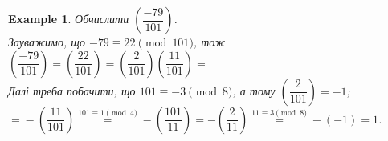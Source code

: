 \documentclass[a4paper, 10pt]{article}
\theoremstyle{theoremdd}
\theoremstyle{theoremdd}
\theoremstyle{theoremdd}
\theoremstyle{theoremdd}
\newtheorem{example}[theorem]{Example}
\theoremstyle{theoremdd}
\theoremstyle{theoremdd}
\theoremstyle{theoremdd}
\theoremstyle{theoremdd}
\begin{document}
\begin{example}
Обчислити $\left( \dfrac{-79}{101} \right)$.\\
Зауважимо, що $-79 \equiv 22 \pmod{101}$, тож\\
 $\left( \dfrac{-79}{101} \right) = \left( \dfrac{22}{101} \right) = \left( \dfrac{2}{101} \right) \left( \dfrac{11}{101} \right) \boxed{=}$\\
Далі треба побачити, що $101 \equiv -3 \pmod 8$, а тому $\left( \dfrac{2}{101} \right) = -1$;\\
$\boxed{=} - \left( \dfrac{11}{101} \right) \overset{101 \equiv 1 \pmod 4}{=} -\left( \dfrac{101}{11} \right) = -\left( \dfrac{2}{11} \right) \overset{11 \equiv 3 \pmod 8}{=} -(-1) = 1$.
\end{example}

\end{document}

